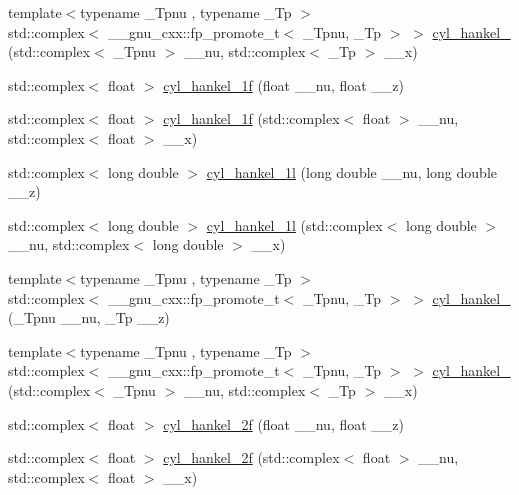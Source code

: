 \begin{DoxyCompactItemize}
{\footnotesize template$<$typename \+\_\+\+Tpnu , typename \+\_\+\+Tp $>$ }\\std\+::complex$<$ \+\_\+\+\_\+gnu\+\_\+cxx\+::fp\+\_\+promote\+\_\+t$<$ \+\_\+\+Tpnu, \+\_\+\+Tp $>$ $>$ \hyperlink{group__mathsf__gnu_ga2f111212d3ec713625acb6986daa925f}{cyl\+\_\+hankel\+\_} (std\+::complex$<$ \+\_\+\+Tpnu $>$ \+\_\+\+\_\+nu, std\+::complex$<$ \+\_\+\+Tp $>$ \+\_\+\+\_\+x)
\item 
std\+::complex$<$ float $>$ \hyperlink{group__mathsf__gnu_ga89758ed03e56567baa62b90cc4784f71}{cyl\+\_\+hankel\+\_\+1f} (float \+\_\+\+\_\+nu, float \+\_\+\+\_\+z)
\item 
std\+::complex$<$ float $>$ \hyperlink{group__mathsf__gnu_ga810e021a3f11c1b2253c15c6f4d41143}{cyl\+\_\+hankel\+\_\+1f} (std\+::complex$<$ float $>$ \+\_\+\+\_\+nu, std\+::complex$<$ float $>$ \+\_\+\+\_\+x)
\item 
std\+::complex$<$ long double $>$ \hyperlink{group__mathsf__gnu_gacb49c66b4267fbc56906db02f14365f2}{cyl\+\_\+hankel\+\_\+1l} (long double \+\_\+\+\_\+nu, long double \+\_\+\+\_\+z)
\item 
std\+::complex$<$ long double $>$ \hyperlink{group__mathsf__gnu_ga6900f79ec70673bcb001538aec74e07c}{cyl\+\_\+hankel\+\_\+1l} (std\+::complex$<$ long double $>$ \+\_\+\+\_\+nu, std\+::complex$<$ long double $>$ \+\_\+\+\_\+x)
\item 
{\footnotesize template$<$typename \+\_\+\+Tpnu , typename \+\_\+\+Tp $>$ }\\std\+::complex$<$ \+\_\+\+\_\+gnu\+\_\+cxx\+::fp\+\_\+promote\+\_\+t$<$ \+\_\+\+Tpnu, \+\_\+\+Tp $>$ $>$ \hyperlink{group__mathsf__gnu_ga7ebc71dd48ac97255d72f5f5f43dfd8e}{cyl\+\_\+hankel\+\_} (\+\_\+\+Tpnu \+\_\+\+\_\+nu, \+\_\+\+Tp \+\_\+\+\_\+z)
\item 
{\footnotesize template$<$typename \+\_\+\+Tpnu , typename \+\_\+\+Tp $>$ }\\std\+::complex$<$ \+\_\+\+\_\+gnu\+\_\+cxx\+::fp\+\_\+promote\+\_\+t$<$ \+\_\+\+Tpnu, \+\_\+\+Tp $>$ $>$ \hyperlink{group__mathsf__gnu_ga326764c0d2dca072c411573503968e50}{cyl\+\_\+hankel\+\_} (std\+::complex$<$ \+\_\+\+Tpnu $>$ \+\_\+\+\_\+nu, std\+::complex$<$ \+\_\+\+Tp $>$ \+\_\+\+\_\+x)
\item 
std\+::complex$<$ float $>$ \hyperlink{group__mathsf__gnu_ga2b75361870975c47d57bed71b4064ce7}{cyl\+\_\+hankel\+\_\+2f} (float \+\_\+\+\_\+nu, float \+\_\+\+\_\+z)
\item 
std\+::complex$<$ float $>$ \hyperlink{group__mathsf__gnu_gae21f9d09b937eaf9729982da5a382f20}{cyl\+\_\+hankel\+\_\+2f} (std\+::complex$<$ float $>$ \+\_\+\+\_\+nu, std\+::complex$<$ float $>$ \+\_\+\+\_\+x)

\end{DoxyCompactItemize}
